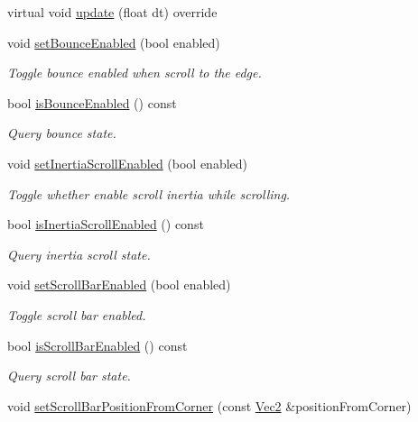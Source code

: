 \begin{DoxyCompactItemize}
\item 
virtual void \hyperlink{classui_1_1ScrollView_a4daad841add32c92b12e8c4c909b2b2e}{update} (float dt) override
\item 
void \hyperlink{classui_1_1ScrollView_a3f5c3723650d5e76b325b29b1a971afa}{set\+Bounce\+Enabled} (bool enabled)
\begin{DoxyCompactList}\small\item\em Toggle bounce enabled when scroll to the edge. \end{DoxyCompactList}\item 
bool \hyperlink{classui_1_1ScrollView_a91e82949b5185d5d49e530d61b77a805}{is\+Bounce\+Enabled} () const
\begin{DoxyCompactList}\small\item\em Query bounce state. \end{DoxyCompactList}\item 
void \hyperlink{classui_1_1ScrollView_a674460116c49a4be56a74ff8ac0bee2c}{set\+Inertia\+Scroll\+Enabled} (bool enabled)
\begin{DoxyCompactList}\small\item\em Toggle whether enable scroll inertia while scrolling. \end{DoxyCompactList}\item 
bool \hyperlink{classui_1_1ScrollView_a19f430a483ad7960e65f8916bee82c24}{is\+Inertia\+Scroll\+Enabled} () const
\begin{DoxyCompactList}\small\item\em Query inertia scroll state. \end{DoxyCompactList}\item 
void \hyperlink{classui_1_1ScrollView_a6c25c25ed2b48a56cd7937dbd173a2a7}{set\+Scroll\+Bar\+Enabled} (bool enabled)
\begin{DoxyCompactList}\small\item\em Toggle scroll bar enabled. \end{DoxyCompactList}\item 
bool \hyperlink{classui_1_1ScrollView_a7af0f12dd78e55e143db6efb5aa29dfe}{is\+Scroll\+Bar\+Enabled} () const
\begin{DoxyCompactList}\small\item\em Query scroll bar state. \end{DoxyCompactList}\item 
void \hyperlink{classui_1_1ScrollView_a3f67e139a785ef521789f9e768f500d7}{set\+Scroll\+Bar\+Position\+From\+Corner} (const \hyperlink{classVec2}{Vec2} \&position\+From\+Corner)

\end{DoxyCompactItemize}

